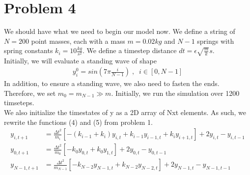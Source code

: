 \documentclass[12pt]{article}
\begin{document}
\section*{Problem 4}
	We should have what we need to begin our model now. We define a string of $N = 200$ point masses, each with a mass $m = 0.02kg$ and $N-1$ springs with spring constants $k_i = 10\frac{kg}{s^2}$. We define a timestep distance $dt = \epsilon\sqrt{\frac{m}{k}}s$. \\
	Initially, we will evaluate a standing wave of shape
\begin{equation}
	\begin{aligned}
		y_i^0 = sin(7\pi\frac{i}{N-1}) \;, \;\; i\in [0, N-1]
	\end{aligned}
\end{equation}
In addition, to ensure a standing wave, we also need to fasten the ends. Therefore, we set $m_0 = m_{N-1} \gg m$. Initially, we run the simulation over 1200 timseteps. \\
	We also initialize the timestates of y as a 2D array of Nxt elements. As such, we rewrite the functions (4) and (5) from problem 1.
\begin{equation}
	\begin{aligned}
		y_{i, t+1} &= \frac{\Delta t^2}{m_i}[ -(k_{i-1} + k_i)y_{i, t} + k_{i-1}y_{i-1, t} + k_iy_{i+1, t} ]
				+ 2y_{i, t} - y_{i, t-1} \\
		y_{0, t+1} &= \frac{\Delta t^2}{m_0} [ -k_0y_{0, t} + k_0y_{1, t} ] + 2y_{0, t} - y_{0, t-1} \\
		y_{N-1, t+1} &= \frac{\Delta t^2}{m_{N-1}} [ -k_{N-2}y_{N-1, t} + k_{N-2}y_{N-2, t} ] 
					+ 2y_{N-1, t} - y_{N-1, t-1}
	\end{aligned}
\end{equation}
\end{document}
